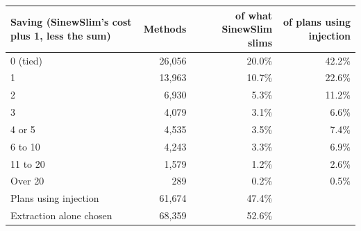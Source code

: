 \begin{tabular}{lrrr}
\toprule
Saving (SinewSlim's cost plus 1, less the sum) & Methods & of what SinewSlim slims & of plans using injection \\
\midrule
0 (tied) & 26{,}056 & 20.0\% & 42.2\% \\
1 & 13{,}963 & 10.7\% & 22.6\% \\
2 & 6{,}930 & 5.3\% & 11.2\% \\
3 & 4{,}079 & 3.1\% & 6.6\% \\
4 or 5 & 4{,}535 & 3.5\% & 7.4\% \\
6 to 10 & 4{,}243 & 3.3\% & 6.9\% \\
11 to 20 & 1{,}579 & 1.2\% & 2.6\% \\
Over 20 & 289 & 0.2\% & 0.5\% \\
\midrule
Plans using injection & 61{,}674 & 47.4\% & \\
Extraction alone chosen & 68{,}359 & 52.6\% & \\
\bottomrule
\end{tabular}
